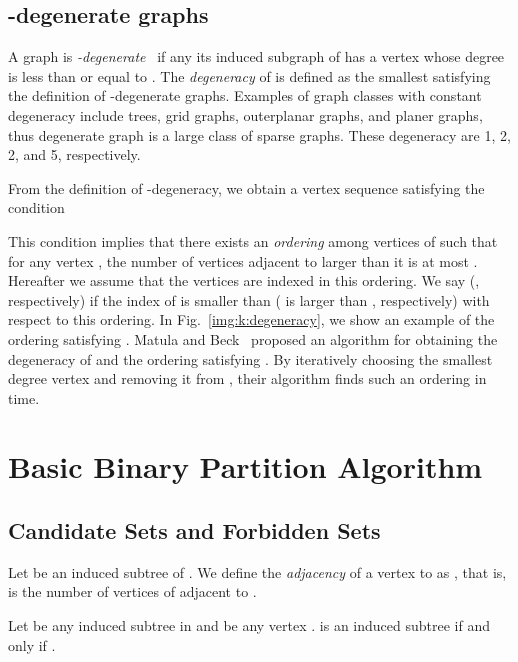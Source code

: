 \documentclass{llncs}
\newcommand{\name}[1]{\textit{#1}}
\begin{document}
\subsection{-degenerate graphs}

A graph  is \name{-degenerate}~\cite{Lick:White:CJM:1970}
if any its induced subgraph of  has 
a vertex whose degree is less than or equal to . 
The \name{degeneracy} of  is defined 
as the smallest  satisfying the definition of -degenerate graphs. 
Examples of graph classes with constant degeneracy include 
trees, grid graphs, outerplanar graphs, and planer graphs, 
thus degenerate graph is a large class of sparse graphs. 
These degeneracy are 1, 2, 2, and 5, respectively. 

From the definition of -degeneracy, 
we obtain a vertex sequence  
satisfying the condition    

This condition  implies that 
there exists an \name{ordering} among vertices of  
such that for any vertex , 
the number of vertices adjacent to  larger than it is at most . 
Hereafter we assume that the vertices 
are indexed in this ordering. 
We say  (, respectively) 
if the index of  is smaller than  ( is larger than , respectively) with respect to this ordering. 
In Fig.~\ref{img:k:degeneracy}, 
we show an example of the ordering
satisfying . 
Matula and Beck~\cite{Matula:Beck:1983} proposed 
an algorithm for obtaining the degeneracy of  and the ordering satisfying . 
By iteratively choosing the smallest degree vertex and removing it from ,  
their algorithm finds such an ordering in  time. 









\section{Basic Binary Partition Algorithm}
\label{sec:algorithm}


\subsection{Candidate Sets and Forbidden Sets}
\label{subsec:can}

Let  be an induced subtree of . 
We define the \name{adjacency} of a vertex  to  
as , 
that is,  is the number of vertices of  adjacent to . 

\begin{lemma}
    \label{lem:neighbor}
    Let  be any induced subtree in  and  be any vertex . 
     is an induced subtree if and only if . 
\end{lemma}
\end{document}
